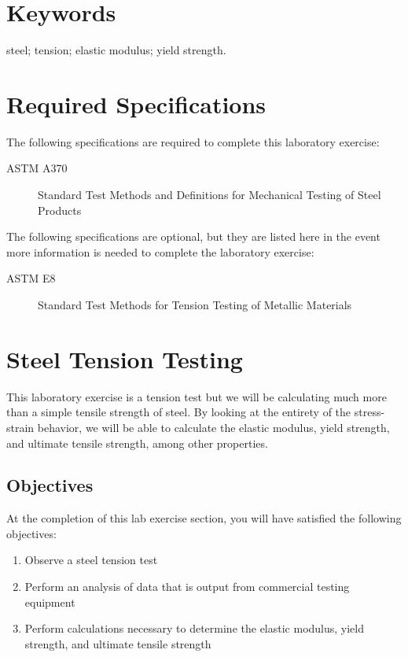 \documentclass[12pt]{article}
\begin{document}
\vfill
\section*{Keywords}
\normalsize steel; tension; elastic modulus; yield strength.\\
\pagebreak
\begin{center}
\tableofcontents
\pagebreak
\listoftables
\listoffigures
\end{center}
\pagebreak
\section*{Required Specifications}
The following specifications are required to complete this laboratory exercise:
\begin{description}
\item[ASTM A370] Standard Test Methods and Definitions for Mechanical Testing of Steel Products
\end{description}

The following specifications are optional, but they are listed here in the event more information is needed to complete the laboratory exercise:
\begin{description}
\item[ASTM E8] Standard Test Methods for Tension Testing of Metallic Materials
\end{description}
\pagebreak
\section{Steel Tension Testing}
\label{sec:intro}
\normalsize 
This laboratory exercise is a tension test but we will be calculating much more than a simple tensile strength of steel. By looking at the entirety of the stress-strain behavior, we will be able to calculate the elastic modulus, yield strength, and ultimate tensile strength, among other properties.

\subsection{Objectives}
\label{ssec:headingscap}
At the completion of this lab exercise section, you will have satisfied the following objectives:
\begin{enumerate}
    \item Observe a steel tension test
    \item Perform an analysis of data that is output from commercial testing equipment
    \item Perform calculations necessary to determine the elastic modulus, yield strength, and ultimate tensile strength
\end{enumerate}
\end{document}
